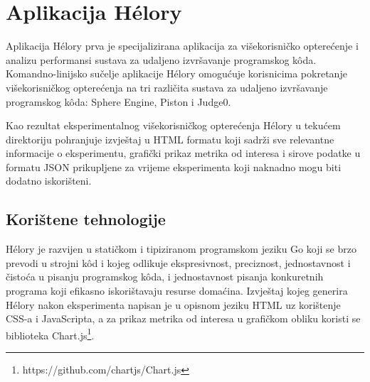 \documentclass[times, utf8, diplomski]{fer}
\begin{document}
\chapter{Aplikacija Hélory}
\label{chap:helory}
Aplikacija Hélory prva je specijalizirana aplikacija za višekorisničko opterećenje i analizu performansi sustava za udaljeno izvršavanje programskog kôda. Komandno-linijsko sučelje aplikacije Hélory omogućuje korisnicima pokretanje višekorisničkog opterećenja na tri različita sustava za udaljeno izvršavanje programskog kôda: Sphere Engine, Piston i Judge0.

Kao rezultat eksperimentalnog višekorisničkog opterećenja Hélory u tekućem direktoriju pohranjuje izvještaj u HTML formatu koji sadrži sve relevantne informacije o eksperimentu, grafički prikaz metrika od interesa i sirove podatke u formatu JSON prikupljene za vrijeme eksperimenta koji naknadno mogu biti dodatno iskorišteni.

\section{Korištene tehnologije}
Hélory je razvijen u statičkom i tipiziranom programskom jeziku Go \citep{donovan2015go} koji se brzo prevodi u strojni kôd i kojeg odlikuje ekspresivnost, preciznost, jednostavnost i čistoća u pisanju programskog kôda, i jednostavnost pisanja konkuretnih programa koji efikasno iskorištavaju resurse domaćina. Izvještaj kojeg generira Hélory nakon eksperimenta napisan je u opisnom jeziku HTML uz korištenje CSS-a i JavaScripta, a za prikaz metrika od interesa u grafičkom obliku koristi se biblioteka Chart.js\footnote{https://github.com/chartjs/Chart.js}.
\end{document}
